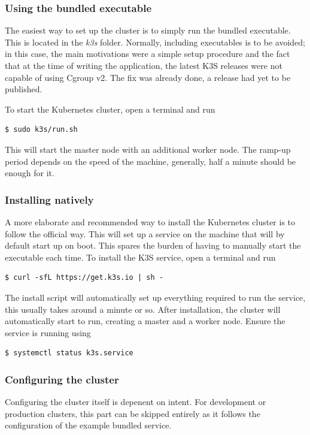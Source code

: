 \subsubsection{Using the bundled executable}
The easiest way to set up the cluster is to simply run the bundled executable. This is located in the  \textit{k3s} folder. Normally, including executables is to be avoided; in this case, the main motivations were a simple setup procedure and the fact that at the time of writing the application, the latest K3S releases were not capable of using Cgroup v2. The fix was already done, a release had yet to be published.

\noindent
To start the Kubernetes cluster, open a terminal and run
\begin{verbatim}
$ sudo k3s/run.sh
\end{verbatim}

\noindent
This will start the master node with an additional worker node. The ramp-up period depends on the speed of the machine, generally, half a minute should be enough for it.

\subsubsection{Installing natively}
A more elaborate and recommended way to install the Kubernetes cluster is to follow the official way. This will set up a service on the machine that will by default start up on boot. This spares the burden of having to manually start the executable each time. To install the K3S service, open a terminal and run
\begin{verbatim}
$ curl -sfL https://get.k3s.io | sh -
\end{verbatim}

\noindent
The install script will automatically set up everything required to run the service, this usually takes around a minute or so. After installation, the cluster will automatically start to run, creating a master and a worker node. Ensure the service is running using
\begin{verbatim}
$ systemctl status k3s.service
\end{verbatim}

\subsubsection{Configuring the cluster}
Configuring the cluster itself is depenent on intent. For development or production clusters, this part can be skipped entirely as it follows the configuration of the example bundled service. \\


